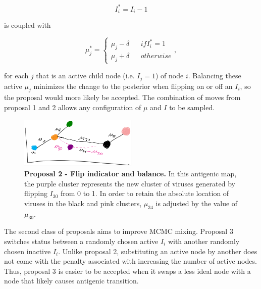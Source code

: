 \documentclass[11pt,oneside,letterpaper]{article}
\begin{document}
\begin{equation}
\label{flipI-equation}
I_i^* = I_i - 1
\end{equation}

is coupled with

\begin{equation}
\label{muBalance-equation}
	\mu_j^{*} =  \left \{
\begin{array}{lllr}
    \mu_j - \delta	&	& if I_i^{*} = 1\\
    \mu_j + \delta	& & otherwise
\end{array}
\right.
,
\end{equation}

for each $j$ that is an active child node (i.e. $I_j = 1$) of node $i$. Balancing these active $\mu_j$ minimizes the change to the posterior when flipping on or off an $I_i$, so the proposal would more likely be accepted. The combination of moves from proposal 1 and 2 allows any configuration of $\mu$ and $I$ to be sampled.



\begin{figure}[h]
	\centering		
	\includegraphics[width=0.5\textwidth]{figures/flipAndBalance}
	\caption{\textbf{Proposal 2 - Flip indicator and balance.} 
In this antigenic map, the purple cluster represents the new cluster of viruses generated by flipping $I_{30}$ from 0 to 1. In order to retain the absolute location of viruses in the black and pink clusters,  $\mu_{34}$ is adjusted by the value of $\mu_{30}$.
	} 
	\label{flipAndBalance} 
\end{figure}


The second class of proposals aims to improve MCMC mixing.
Proposal 3 switches status between a randomly chosen active $I_i$ with another randomly chosen inactive $I_i$. 
Unlike proposal 2, substituting an active node by another does not come with the penalty associated with increasing the number of active nodes.
Thus, proposal 3 is easier to be accepted when it swaps a less ideal node with a node that likely causes antigenic transition.
\end{document}
